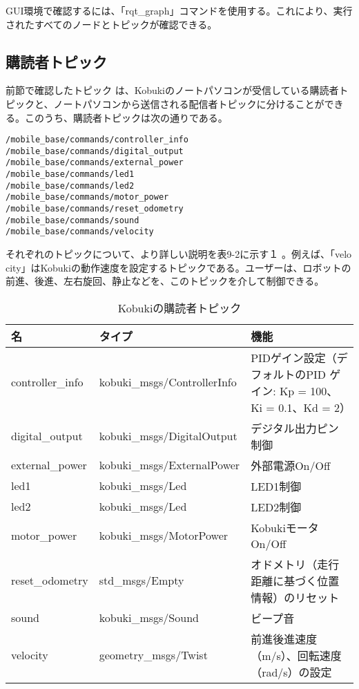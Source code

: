 \begin{itemize}
GUI環境で確認するには、「rqt\_graph」コマンドを使用する。これにより、実行されたすべてのノードとトピックが確認できる。

\subsection{購読者トピック}

前節で確認したトピック  は、Kobukiのノートパソコンが受信している購読者トピックと、ノートパソコンから送信される配信者トピックに分けることができる。このうち、購読者トピックは次の通りである。

\begin{lstlisting}[language=ROS]
/mobile_base/commands/controller_info
/mobile_base/commands/digital_output
/mobile_base/commands/external_power
/mobile_base/commands/led1
/mobile_base/commands/led2
/mobile_base/commands/motor_power
/mobile_base/commands/reset_odometry
/mobile_base/commands/sound
/mobile_base/commands/velocity
\end{lstlisting}

それぞれのトピックについて、より詳しい説明を表9-2に示す１ 。例えば、「velo\\city」はKobukiの動作速度を設定するトピックである。ユーザーは、ロボットの前進、後進、左右旋回、静止などを、このトピックを介して制御できる。

\begin{table}[htp]
\centering
\small
\begin{tabular}{p{2cm} p{5cm} p{5cm}}
\toprule
\textbf{名} & \textbf{タイプ} & \textbf{機能}\\
\midrule
controller\_info & kobuki\_msgs/ControllerInfo  &  PIDゲイン設定（デフォルトのPID ゲイン: Kp = 100、Ki = 0.1、Kd = 2）}\\
digital\_output  & kobuki\_msgs/DigitalOutput & デジタル出力ピン制御 \\
external\_power  & kobuki\_msgs/ExternalPower & 外部電源On/Off \\
led1 & kobuki\_msgs/Led & LED1制御 \\
led2  & kobuki\_msgs/Led & LED2制御 \\
motor\_power & kobuki\_msgs/MotorPower  & KobukiモータOn/Off \\
reset\_odometry  & std\_msgs/Empty  & オドメトリ（走行距離に基づく位置情報）のリセット \\
sound & kobuki\_msgs/Sound & ビープ音 \\
velocity  & geometry\_msgs/Twist & 前進後進速度（m/s）、回転速度（rad/s）の設定 \\
\bottomrule
\end{tabular}
\caption{Kobukiの購読者トピック}
\end{table}


\end{itemize}
